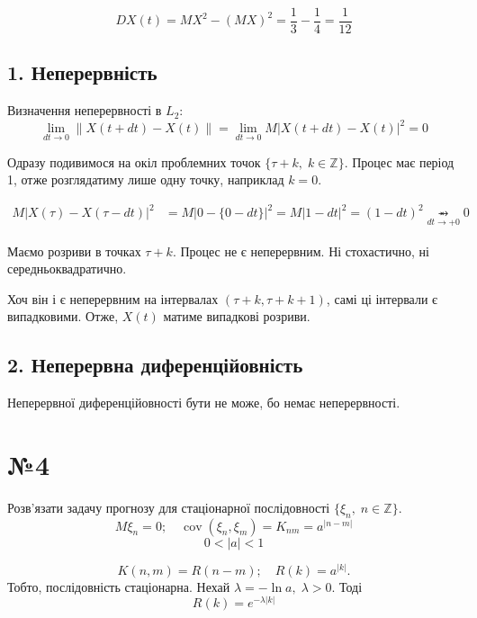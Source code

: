 \documentclass[11pt, a4paper]{article} %
\DeclareMathOperator{\cov}{cov}
\begin{document}
\[DX(t) = MX^2 - (MX)^2 = \frac{1}{3} - \frac{1}{4} = \frac{1}{12}\]

\subsection*{1. Неперервність}
Визначення неперервності в $L_2$:
\[\lim_{dt \to 0} \|X(t+dt)-X(t)\| = \lim_{dt\to 0 }M\left|X(t+dt)-X(t)\right|^2 = 0\]

Одразу подивимося на окіл проблемних точок $\{\tau+k,\; k\in\mathbb Z\}$.
Процес має період 1, отже розглядатиму лише одну точку, наприклад $k=0$.

\begin{align*}
    M\left|X(\tau)-X(\tau-dt)\right|^2 &= M\left|0-\{0-dt\}\right|^2 = M\left|1-dt\right|^2 = (1-dt)^2 \underset{dt \to +0}{\rightarrowx} 0
\end{align*}

Маємо розриви в точках $\tau+k$. Процес не є неперервним. Ні стохастично, ні середньоквадратично. 

Хоч він і є неперервним на інтервалах $(\tau+k, \tau+k+1)$, самі ці інтервали є випадковими. 
Отже, $X(t)$ матиме випадкові розриви.


\subsection*{2. Неперервна диференційовність}
Неперервної диференційовності бути не може, бо немає неперервності.

\pagebreak

\section*{№4}
\begin{mdframed}
    Розв'язати задачу прогнозу для стаціонарної послідовності $\{\xi_n,\;n\in\mathbb Z\}$.
    \[M\xi_n = 0; \quad \cov(\xi_n,\xi_m) = K_{nm} = a^{|n-m|}\]
    \[0<|a|<1\]
\end{mdframed}

\[K(n,m) = R(n-m); \quad R(k) = a^{|k|}.\]
Тобто, послідовність стаціонарна. Нехай $\lambda = -\ln a, \; \lambda > 0$.
Тоді 
\[R(k) = e^{-\lambda|k|}\]
\end{document}

